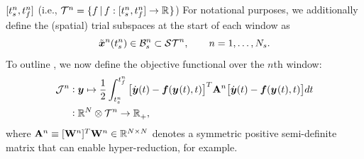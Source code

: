 $[\timeStartArg{n},\timeEndArg{n}]$ (i.e., $\timeSpaceArg{n} = \{f\,|\,f:[\timeStartArg{n},\timeEndArg{n}]\rightarrow\RR{}\}$)
For notational purposes, we additionally define the (spatial) trial subspaces at the start of each window as
$$\approxstateArg{n}{\timeStartArg{n}} \in \stspaceBoundStartArg{n} \subset \stspaceArg{n}, \qquad n=1,\ldots,\nslabs. 
$$ 
To outline \methodAcronym, we now define the objective functional over the $n$th window:
\begin{equation}\label{eq:obj}
\begin{split} \mathcal{J}^n &\vcentcolon \statey \mapsto
\frac{1}{2} \int_{\timeStartArg{n}}^{\timeEndArg{n}} \big[ \dot{\statey}(t)
- \velocity(\stateyArg{}{t},t) \big]^T \stweightingMatArgt{n}{t} \big[
\dot{\statey}(t) - \velocity(\stateyArg{}{t},t) \big] d t \\
&\vcentcolon \RR{\fomdim}\otimes \timeSpaceArg{n}  \rightarrow
\RRplus, 
\end{split}
\end{equation}
where $\stweightingMatArg{n} \equiv \stweightingMatOneTArg{n}
\stweightingMatOneArg{n} \in \RR{\fomdim \times \fomdim}$ denotes a
symmetric positive semi-definite matrix that can enable hyper-reduction, for
example. 

